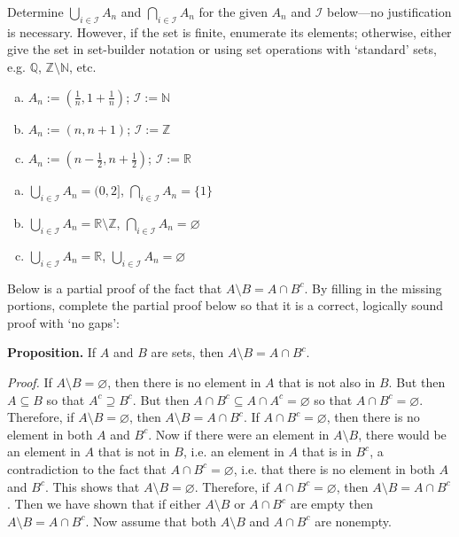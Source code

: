 \documentclass[11pt,letterpaper]{article}
\begin{document}
\newpage



 Determine $\displaystyle \bigcup_{i \in \mathcal{I}} A_n$ and $\displaystyle \bigcap_{i \in \mathcal{I}} A_n$ for the given $A_n$ and $\mathcal{I}$ below---no justification is necessary. However, if the set is finite, enumerate its elements; otherwise, either give the set in set-builder notation or using set operations with `standard' sets, e.g. $\mathbb{Q}$, $\mathbb{Z} \setminus \mathbb{N}$, etc. 
	\begin{enumerate}[(a)]
	\item $A_n:= \left( \frac{1}{n}, 1 + \frac{1}{n} \right)$; $\mathcal{I}:= \mathbb{N}$
	\item $A_n:= \left( n, n + 1 \right)$; $\mathcal{I}:= \mathbb{Z}$
	\item $A_n:= \left( n - \frac{1}{2}, n + \frac{1}{2} \right)$; $\mathcal{I}:= \mathbb{R}$
	\end{enumerate} \pspace

\sol
\begin{enumerate}[(a)]
\item $\displaystyle \bigcup_{i \in \mathcal{I}} A_n= (0, 2]$, \quad $\displaystyle \bigcap_{i \in \mathcal{I}} A_n= \{ 1 \}$

\item $\displaystyle \bigcup_{i \in \mathcal{I}} A_n= \mathbb{R} \setminus \mathbb{Z}$, \quad $\displaystyle \bigcap_{i \in \mathcal{I}} A_n= \varnothing$

\item $\displaystyle \bigcup_{i \in \mathcal{I}} A_n= \mathbb{R}$, \quad $\displaystyle \bigcup_{i \in \mathcal{I}} A_n= \varnothing$
\end{enumerate}



\newpage



 Below is a partial proof of the fact that $A \setminus B= A \cap B^c$. By filling in the missing portions, complete the partial proof below so that it is a correct, logically sound proof with `no gaps': \pspace

{\bfseries Proposition.} If $A$ and $B$ are sets, then $A \setminus B= A \cap B^c$. \pspace

{\itshape Proof.} If $A \setminus B= \varnothing$, then there is no element in $A$ that is not also in $B$. But then $A \subseteq B$ so that $A^c \supseteq B^c$. But then $A \cap B^c \subseteq A \cap A^c= \varnothing$ so that $A \cap B^c= \varnothing$. Therefore, if $A \setminus B= \varnothing$, then $A \setminus B= A \cap B^c$. If $A \cap B^c= \varnothing$, then there is no element in both $A$ and $B^c$. Now if there were an element in $A \setminus B$, there would be an element in $A$ that is not in $B$, i.e. an element in $A$ that is in $B^c$, a contradiction to the fact that $A \cap B^c= \varnothing$, i.e. that there is no element in both $A$ and $B^c$. This shows that $A \setminus B= \varnothing$. Therefore, if $A \cap B^c= \varnothing$, then $A \setminus B= A \cap B^c$. Then we have shown that if either $A \setminus B$ or $A \cap B^c$ are empty then $A \setminus B= A \cap B^c$. Now assume that both $A \setminus B$ and $A \cap B^c$ are nonempty. \pspace
\end{document}
